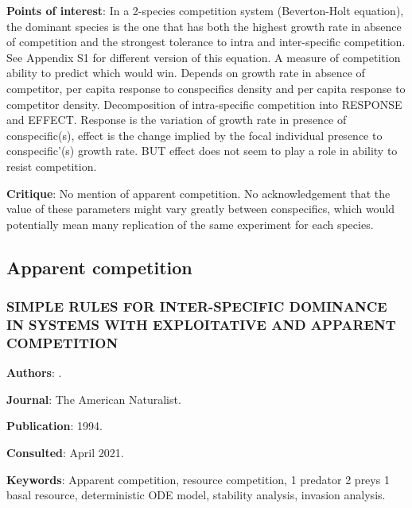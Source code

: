 \documentclass[12pt,a4paper]{article}
\begin{document}
\textbf{Points of interest}: In a 2-species competition system (Beverton-Holt equation), the dominant species is the one that has both the highest growth rate in absence of competition and the strongest tolerance to intra and inter-specific competition. See Appendix S1 for different version of this equation. A measure of competition ability to predict which would win. Depends on growth rate in absence of competitor, per capita response to conspecifics density and per capita response to competitor density. Decomposition of intra-specific competition into RESPONSE and EFFECT. Response is the variation of growth rate in presence of conspecific(s), effect is the change implied by the focal individual presence to conspecific'(s) growth rate. BUT effect does not seem to play a role in ability to resist competition.

\textbf{Critique}: No mention of apparent competition. No acknowledgement that the value of these parameters might vary greatly between conspecifics, which would potentially mean many replication of the same experiment for each species.

\newpage

\subsection*{Apparent competition}

\subsubsection*{SIMPLE RULES FOR INTER-SPECIFIC DOMINANCE IN SYSTEMS WITH EXPLOITATIVE AND APPARENT COMPETITION}

\textbf{Authors}: \cite{holt1994simple}.

\textbf{Journal}: The American Naturalist.

\textbf{Publication}: 1994.

\textbf{Consulted}: April 2021.

\textbf{Keywords}: Apparent competition, resource competition, 1 predator 2 preys 1 basal resource, deterministic ODE model, stability analysis, invasion analysis.
\end{document}
